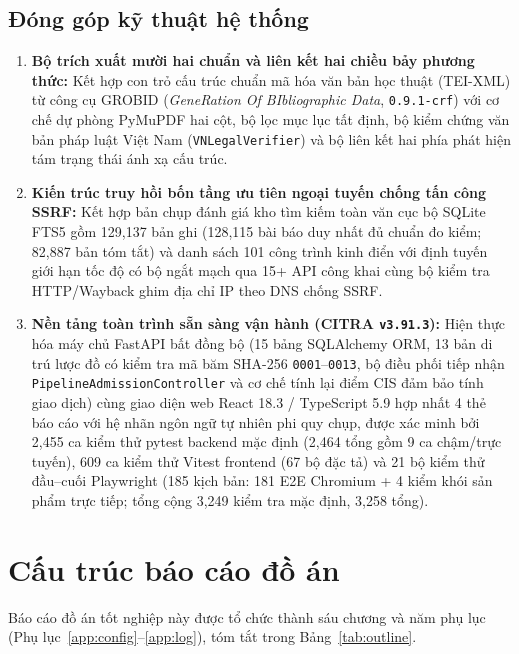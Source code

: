 \subsection{Đóng góp kỹ thuật hệ thống}
\begin{enumerate}
    \item \textbf{Bộ trích xuất mười hai chuẩn và liên kết hai chiều bảy phương thức:} Kết hợp con trỏ cấu trúc chuẩn mã hóa văn bản học thuật (TEI-XML) từ công cụ GROBID (\textit{GeneRation Of BIbliographic Data}, \texttt{0.9.1-crf}) với cơ chế dự phòng PyMuPDF hai cột, bộ lọc mục lục tất định, bộ kiểm chứng văn bản pháp luật Việt Nam (\texttt{VNLegalVerifier}) và bộ liên kết hai phía phát hiện tám trạng thái ánh xạ cấu trúc.
    \item \textbf{Kiến trúc truy hồi bốn tầng ưu tiên ngoại tuyến chống tấn công SSRF:} Kết hợp bản chụp đánh giá kho tìm kiếm toàn văn cục bộ SQLite FTS5 gồm 129,137 bản ghi (128,115 bài báo duy nhất đủ chuẩn đo kiểm; 82,887 bản tóm tắt) và danh sách 101 công trình kinh điển với định tuyến giới hạn tốc độ có bộ ngắt mạch qua 15+ API công khai cùng bộ kiểm tra HTTP/Wayback ghim địa chỉ IP theo DNS chống SSRF.
    \item \textbf{Nền tảng toàn trình sẵn sàng vận hành (\textbf{CITRA} \texttt{v3.91.3}):} Hiện thực hóa máy chủ FastAPI bất đồng bộ (15 bảng SQLAlchemy ORM, 13 bản di trú lược đồ có kiểm tra mã băm SHA-256 \texttt{0001}--\texttt{0013}, bộ điều phối tiếp nhận \texttt{PipelineAdmissionController} và cơ chế tính lại điểm CIS đảm bảo tính giao dịch) cùng giao diện web React 18.3 / TypeScript 5.9 hợp nhất 4 thẻ báo cáo với hệ nhãn ngôn ngữ tự nhiên phi quy chụp, được xác minh bởi 2,455 ca kiểm thử pytest backend mặc định (2,464 tổng gồm 9 ca chậm/trực tuyến), 609 ca kiểm thử Vitest frontend (67 bộ đặc tả) và 21 bộ kiểm thử đầu--cuối Playwright (185 kịch bản: 181 E2E Chromium + 4 kiểm khói sản phẩm trực tiếp; tổng cộng 3,249 kiểm tra mặc định, 3,258 tổng).
\end{enumerate}

\section{Cấu trúc báo cáo đồ án}

Báo cáo đồ án tốt nghiệp này được tổ chức thành sáu chương và năm phụ lục (Phụ lục~\ref{app:config}--\ref{app:log}), tóm tắt trong Bảng~\ref{tab:outline}.

